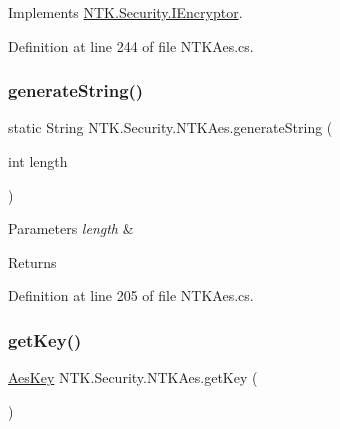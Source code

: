 Implements \mbox{\hyperlink{interface_n_t_k_1_1_security_1_1_i_encryptor_a6a993afc13699a6dcdedcdb092fbbea4}{N\+T\+K.\+Security.\+I\+Encryptor}}.



Definition at line 244 of file N\+T\+K\+Aes.\+cs.

\mbox{\label{class_n_t_k_1_1_security_1_1_n_t_k_aes_a72c55f8ff0d45262ff7a38ea756b86e2}} 
\subsubsection{\texorpdfstring{generateString()}{generateString()}}
{\footnotesize\ttfamily static String N\+T\+K.\+Security.\+N\+T\+K\+Aes.\+generate\+String (\begin{DoxyParamCaption}\item[{int}]{length }\end{DoxyParamCaption})\hspace{0.3cm}{\ttfamily [static]}}






\begin{DoxyParams}{Parameters}
{\em length} & \\
\hline
\end{DoxyParams}
\begin{DoxyReturn}{Returns}

\end{DoxyReturn}


Definition at line 205 of file N\+T\+K\+Aes.\+cs.

\mbox{\label{class_n_t_k_1_1_security_1_1_n_t_k_aes_a19ffab44349e954e69e9eb1831c9ceae}} 
\subsubsection{\texorpdfstring{getKey()}{getKey()}}
{\footnotesize\ttfamily \mbox{\hyperlink{struct_n_t_k_1_1_security_1_1_aes_key}{Aes\+Key}} N\+T\+K.\+Security.\+N\+T\+K\+Aes.\+get\+Key (\begin{DoxyParamCaption}{ }\end{DoxyParamCaption})}





